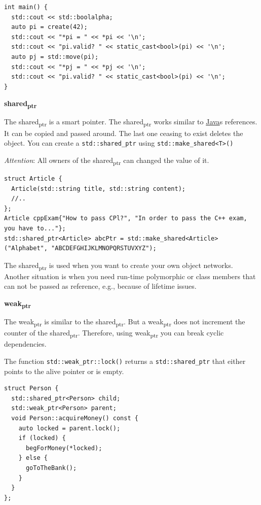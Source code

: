\documentclass[11pt,twoside,landscape]{article}
\begin{document}
\begin{multicols}{3}
\begin{lstlisting}
int main() {
  std::cout << std::boolalpha;
  auto pi = create(42);
  std::cout << "*pi = " << *pi << '\n';
  std::cout << "pi.valid? " << static_cast<bool>(pi) << '\n';
  auto pj = std::move(pi);
  std::cout << "*pj = " << *pj << '\n';
  std::cout << "pi.valid? " << static_cast<bool>(pi) << '\n';
}
\end{lstlisting}

\textbf{shared\textsubscript{ptr}}

The shared\textsubscript{ptr} is a smart pointer.
The shared\textsubscript{ptr} works similar to \href{../../../roam/20201116150053-java.org}{Java}s references.
It can be copied and passed around.
The last one ceasing to exist deletes the object.
You can create a \texttt{std::shared\_ptr} using \texttt{std::make\_shared<T>()}

\emph{Attention}: All owners of the shared\textsubscript{ptr} can changed the value of it.


\lstset{language=c++,label= ,caption= ,captionpos=b,numbers=none}
\begin{lstlisting}
struct Article {
  Article(std::string title, std::string content);
  //..
};
Article cppExam{"How to pass CPl?", "In order to pass the C++ exam, you have to..."};
std::shared_ptr<Article> abcPtr = std::make_shared<Article>("Alphabet", "ABCDEFGHIJKLMNOPQRSTUVXYZ");
\end{lstlisting}


The shared\textsubscript{ptr} is used when you want to create your own object networks.
Another situation is when you need run-time polymorphic or class members that can not be passed as reference, e.g., because of lifetime issues.

\textbf{weak\textsubscript{ptr}}

The weak\textsubscript{ptr} is similar to the shared\textsubscript{ptr}.
But a weak\textsubscript{ptr} does not increment the counter of the shared\textsubscript{ptr}.
Therefore, using weak\textsubscript{ptr} you can break cyclic dependencies.

The function \texttt{std::weak\_ptr::lock()} returns a \texttt{std::shared\_ptr} that either points to the alive pointer or is empty.


\lstset{language=c++,label= ,caption= ,captionpos=b,numbers=none}
\begin{lstlisting}
struct Person {
  std::shared_ptr<Person> child;
  std::weak_ptr<Person> parent;
  void Person::acquireMoney() const {
    auto locked = parent.lock();
    if (locked) {
      begForMoney(*locked);
    } else {
      goToTheBank();
    }
  }
};
\end{lstlisting}


\end{multicols}
\end{document}
